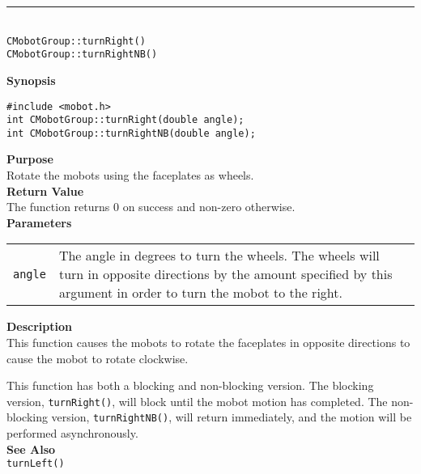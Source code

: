 \noindent
\vspace{5pt}
\rule{4.5in}{0.015in}\\
\noindent
{\LARGE \texttt{CMobotGroup::turnRight()}}\\
{\LARGE \texttt{CMobotGroup::turnRightNB()}}\\
{}

\noindent
{\bf Synopsis}
\vspace{-8pt}
\begin{verbatim}
#include <mobot.h>
int CMobotGroup::turnRight(double angle);
int CMobotGroup::turnRightNB(double angle);
\end{verbatim}

\noindent
{\bf Purpose}\\
Rotate the mobots using the faceplates as wheels.\\

\noindent
{\bf Return Value}\\
The function returns 0 on success and non-zero otherwise.\\

\noindent
{\bf Parameters}\\
\vspace{-0.1in}
\begin{description}
\item               
\begin{tabular}{p{10 mm}p{145 mm}}
\texttt{angle} & The angle in degrees to turn the wheels. The wheels will turn in opposite directions by the amount specified by this argument in order to turn the mobot to the right. \\
\end{tabular}
\end{description}

\noindent
{\bf Description}\\
This function causes the mobots to rotate the faceplates in opposite directions
to cause the mobot to rotate clockwise.

This function has both a blocking and non-blocking version.
The blocking version, \texttt{turnRight()}, will block until the
mobot motion has completed. The non-blocking version, \texttt{turnRightNB()},
will return immediately, and the motion will be performed asynchronously.\\

\noindent
{\bf See Also}\\
\texttt{turnLeft()}

